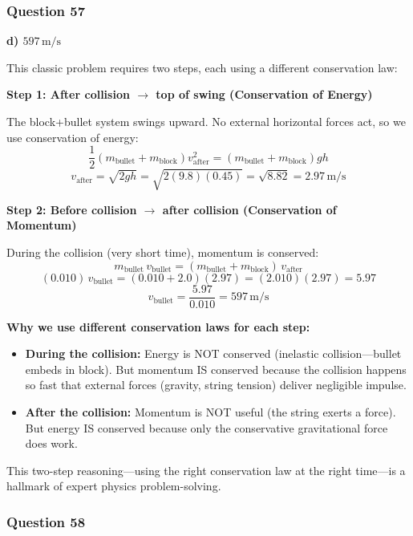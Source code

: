 \documentclass[12pt,letterpaper]{article}
\begin{document}
\subsubsection*{Question 57}

\begin{answerbox}
\textbf{d) $597\,\text{m/s}$}
\end{answerbox}

\begin{explanationbox}
This classic problem requires two steps, each using a different conservation law:

\textbf{Step 1: After collision $\to$ top of swing (Conservation of Energy)}

The
block+bullet system swings upward. No external horizontal forces act, so we use conservation of energy:
\[
\frac{1}{2}(m_{\text{bullet}} + m_{\text{block}})v_{\text{after}}^2 = (m_{\text{bullet}} + m_{\text{block}})gh
\]
\[
v_{\text{after}} = \sqrt{2gh} = \sqrt{2(9.8)(0.45)} = \sqrt{8.82} = 2.97\,\text{m/s}
\]

\textbf{Step 2: Before collision $\to$ after collision (Conservation of Momentum)}

During the collision (very short time), momentum is conserved:
\[
m_{\text{bullet}}\,v_{\text{bullet}} = (m_{\text{bullet}} + m_{\text{block}})\,v_{\text{after}}
\]
\[
(0.010)\,v_{\text{bullet}} = (0.010 + 2.0)(2.97) = (2.010)(2.97) = 5.97
\]
\[
v_{\text{bullet}} = \frac{5.97}{0.010} = 597\,\text{m/s}
\]

\textbf{Why we use different conservation laws for each step:}
\begin{itemize}
\item \textbf{During the collision:} Energy is NOT conserved (inelastic collision---bullet embeds in block). But momentum IS conserved because the collision happens so fast that external forces (gravity, string tension) deliver negligible impulse.
\item \textbf{After the collision:} Momentum is NOT useful (the string exerts a force). But energy IS conserved because only the conservative gravitational force does work.
\end{itemize}

This two-step reasoning---using the right conservation law at the right time---is a hallmark of expert physics problem-solving.
\end{explanationbox}

\subsubsection*{Question 58}
\end{document}
